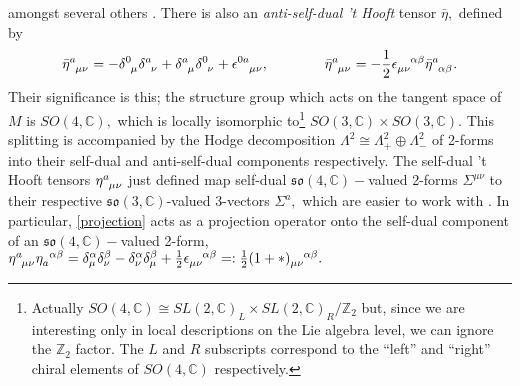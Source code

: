 \documentclass[a4paper,12pt, onecolumn, notitlepage]{article}
\theoremstyle{definition}
\theoremstyle{remark}
\newcommand{\al}{\alpha}
\newcommand{\m}{\mu}
\newcommand{\n}{\nu}
\newcommand{\e}{\epsilon}
\newcommand{\hooft}[3]{\eta\indices{^{#1}_{#2}_{#3}}}
\newcommand{\ihooft}[3]{\eta\indices{_{#1}^{#2}^{#3}}}
\begin{document}
amongst several others \cite{hooft_1976}. There is also an \emph{anti-self-dual 't Hooft} tensor $\bar{\eta},$ defined by
\begin{equation}
\label{asdhooft}
\bar{\eta}\indices{^a_\m_\n} =  -\delta\indices{^0_\mu}\delta\indices{^a_\nu} + \delta\indices{^a_\mu}\delta\indices{^0_\nu} + \epsilon\indices{^0^a_\mu_\nu},\qquad\qquad\bar{\eta}\indices{^a_\m_\n}=-\frac{1}{2}\e\indices{_\m_\n^\al^\beta}\bar{\eta}\indices{^a_\al_\beta}.\\
\end{equation}
Their significance is this; the structure group which acts on the tangent space of $M$ is $SO(4,\mathbb{C}),$ which is locally isomorphic to\footnote{Actually $SO(4,\mathbb{C}) \cong SL(2,\mathbb{C})_{L}\times SL(2,\mathbb{C})_{R}/\mathbb{Z}_{2}$ but, since we are interesting only in local descriptions on the Lie algebra level, we can ignore the $\mathbb{Z}_{2}$ factor. The $L$ and $R$ subscripts correspond to the ``left'' and ``right'' chiral elements of $SO(4,\mathbb{C})$ respectively.} $SO(3,\mathbb{C})\times SO(3,\mathbb{C}).$ This splitting is accompanied by the Hodge decomposition $\Lambda^{2}\cong\Lambda_{+}^{2}\oplus\Lambda^{2}_{-}$ of 2-forms into their self-dual and anti-self-dual components respectively. The self-dual 't Hooft tensors $\hooft{a}{\m}{\n}$ just defined map self-dual $\mathfrak{so}(4,\mathbb{C})-$valued 2-forms $\Sigma^{\m\n}$ to their respective $\mathfrak{so}(3,\mathbb{C})$-valued 3-vectors $\Sigma^{a},$ which are easier to work with \cite{hooft_1976}. In particular, \cref{projection} acts as a projection operator onto the self-dual component of an $\mathfrak{so}(4,\mathbb{C})-$valued 2-form, $\hooft{a}{\m}{\n}\ihooft{a}{\al}{\beta} = \delta^{\al}_{\m}\delta^{\beta}_{\n} - \delta^{\al}_{\n}\delta^{\beta}_{\m} +\frac{1}{2}\e\indices{_\m_\n^\al^\beta} =: \frac{1}{2}(1+\ast)\indices{_\m_\n^\al^\beta}.$\\
\end{document}
